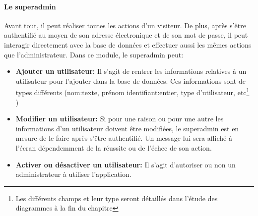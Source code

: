         \paragraph{Le superadmin}
        Avant tout, il peut réaliser toutes les actions d'un visiteur. De plus, après s'être authentifié au moyen de 
        son adresse électronique et de son mot de passe, il peut interagir directement avec la base de données et 
        effectuer aussi les mêmes actions que l'administrateur.
        Dans ce module, le superadmin peut:
        \begin{itemize}
                \item \textbf{Ajouter un utilisateur: }
                Il s'agit de rentrer les informations relatives à un utilisateur pour l'ajouter dans la base de données.
                Ces informations sont de types différents (nom:texte, prénom identifiant:entier, type d'utilisateur, 
                etc\footnote{Les différents champs et leur type seront 
                détaillés dans l'étude des diagrammes à la fin du chapitre} )
                \item \textbf{Modifier un utilisateur: }
                Si pour une raison ou pour une autre les informations d'un utilisateur doivent être modifiées, le superadmin est en
                mesure de le faire après s'être authentifié. Un message lui sera affiché à l'écran dépendemment 
                de la réussite ou de l'échec de son action.
                \item \textbf{Activer ou désactiver un utilisateur: }
                Il s'agit d'autoriser ou non un administrateur à utiliser l'application.
        \end{itemize}
          

